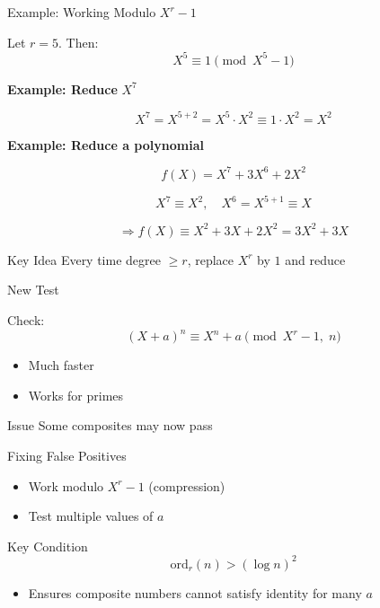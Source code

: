 \documentclass{beamer}
\begin{document}
\begin{frame}{Example: Working Modulo $X^r - 1$}

Let $r = 5$. Then:
\[
X^5 \equiv 1 \pmod{X^5 - 1}
\]


\textbf{Example: Reduce } $X^7$

\[
X^7 = X^{5+2} = X^5 \cdot X^2 \equiv 1 \cdot X^2 = X^2
\]


\end{frame}
\begin{frame}
\textbf{Example: Reduce a polynomial}

\[
f(X) = X^7 + 3X^6 + 2X^2
\]

\[
X^7 \equiv X^2,\quad X^6 = X^{5+1} \equiv X
\]

\[
\Rightarrow f(X) \equiv X^2 + 3X + 2X^2 = 3X^2 + 3X
\]


\begin{block}{Key Idea}
Every time degree $\ge r$, replace $X^r$ by $1$ and reduce
\end{block}

\end{frame}


\begin{frame}{New Test}

Check:
\[
(X+a)^n \equiv X^n + a \pmod{X^r -1,\; n}
\]


\begin{itemize}
    \item Much faster
    \item Works for primes
\end{itemize}


\begin{block}{Issue}
Some composites may now pass
\end{block}

\end{frame}


\begin{frame}{Fixing False Positives}

\begin{itemize}
    \item Work modulo $X^r - 1$ (compression)
    \item Test multiple values of $a$
\end{itemize}


\begin{block}{Key Condition}
\[
\mathrm{ord}_r(n) > (\log n)^2
\]
\end{block}

\vspace{0.5em}

\begin{itemize}
    \item Ensures composite numbers cannot satisfy identity for many $a$
\end{itemize}

\end{frame}
\end{document}

